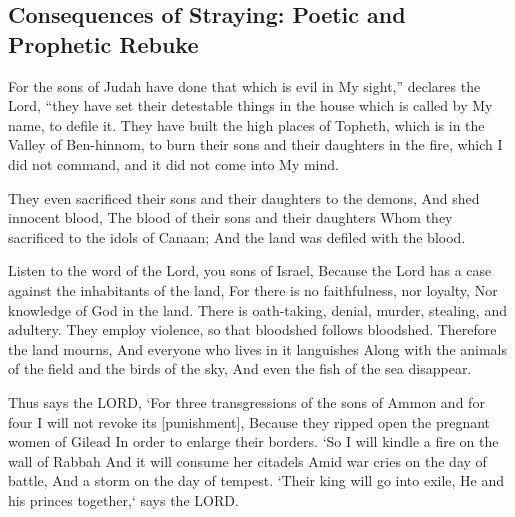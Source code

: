 \vspace{2\baselineskip}

\pagebreak
\subsection{Consequences of Straying: Poetic and Prophetic Rebuke}

\begin{scripture}[Jeremiah 7:30-31]
    For the sons of Judah have done that which is evil in My sight,” declares the Lord, “they have set their detestable things in the house which is called by My name, to defile it.
    They have built the high places of Topheth, which is in the Valley of Ben-hinnom, to burn their sons and their daughters in the fire, which I did not command, and it did not come into My mind.
\end{scripture}

\vspace{2\baselineskip}

\begin{scripture}[Psalm 106:37-38]
    They even sacrificed their sons and their daughters to the demons,
    And shed innocent blood,
    The blood of their sons and their daughters
    Whom they sacrificed to the idols of Canaan;
    And the land was defiled with the blood.  
\end{scripture}

\vspace{2\baselineskip}

\begin{scripture}[Hosea4:1-3]
    Listen to the word of the Lord, you sons of Israel,
    Because the Lord has a case against the inhabitants of the land,
    For there is no faithfulness, nor loyalty,
    Nor knowledge of God in the land.
    There is oath-taking, denial, murder, stealing, and adultery.
    They employ violence, so that bloodshed follows bloodshed.
    Therefore the land mourns,
    And everyone who lives in it languishes
    Along with the animals of the field and the birds of the sky,
    And even the fish of the sea disappear.
\end{scripture}

\vspace{2\baselineskip}

\begin{scripture}[Amos 1:13-15]
    Thus says the LORD, `For three transgressions of the sons of Ammon and for four I will not revoke its [punishment], Because they ripped open the pregnant women of Gilead In order to enlarge their borders.
    `So I will kindle a fire on the wall of Rabbah And it will consume her citadels Amid war cries on the day of battle, And a storm on the day of tempest.
    `Their king will go into exile, He and his princes together,` says the LORD. 
\end{scripture}